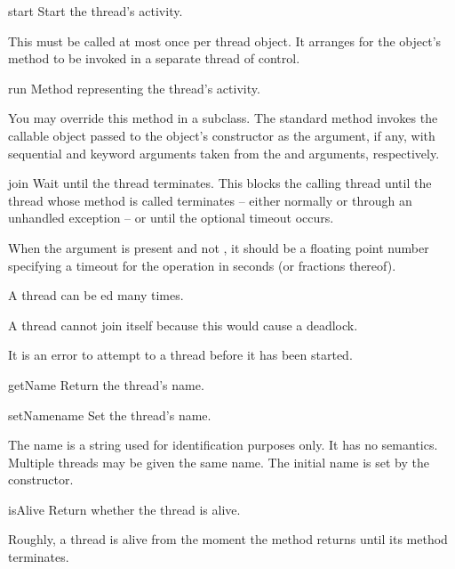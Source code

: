 \begin{methoddesc}{start}{}
Start the thread's activity.

This must be called at most once per thread object.  It
arranges for the object's  method to be invoked in a
separate thread of control.
\end{methoddesc}

\begin{methoddesc}{run}{}
Method representing the thread's activity.

You may override this method in a subclass.  The standard
 method invokes the callable object passed to the
object's constructor as the  argument, if any, with
sequential and keyword arguments taken from the  and
 arguments, respectively.
\end{methoddesc}

\begin{methoddesc}{join}{}
Wait until the thread terminates.
This blocks the calling thread until the thread whose 
method is called terminates -- either normally or through an
unhandled exception -- or until the optional timeout occurs.

When the  argument is present and not , it
should be a floating point number specifying a timeout for the
operation in seconds (or fractions thereof).

A thread can be ed many times.

A thread cannot join itself because this would cause a
deadlock.

It is an error to attempt to  a thread before it has
been started.
\end{methoddesc}

\begin{methoddesc}{getName}{}
Return the thread's name.
\end{methoddesc}

\begin{methoddesc}{setName}{name}
Set the thread's name.

The name is a string used for identification purposes only.
It has no semantics.  Multiple threads may be given the same
name.  The initial name is set by the constructor.
\end{methoddesc}

\begin{methoddesc}{isAlive}{}
Return whether the thread is alive.

Roughly, a thread is alive from the moment the  method
returns until its  method terminates.
\end{methoddesc}

